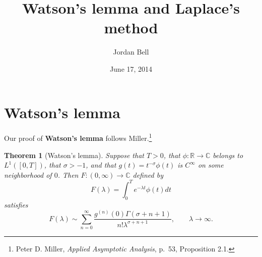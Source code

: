 \documentclass{article}
\newtheorem{theorem}{Theorem}
\theoremstyle{definition}
\begin{document}
\title{Watson's lemma and Laplace's method}
\author{Jordan Bell}
\date{June 17, 2014}

\maketitle


\section{Watson's lemma}
Our proof of \textbf{Watson's lemma} follows Miller.\footnote{Peter D. Miller, {\em Applied Asymptotic Analysis}, p.~53, Proposition 2.1.}

\begin{theorem}[Watson's lemma]
Suppose that $T>0$, that $\phi:\mathbb{R} \to \mathbb{C}$ belongs to 
$L^1([0,T])$, 
that $\sigma>-1$, and that  $g(t)=t^{-\sigma} \phi(t)$ is $C^\infty$ on some neighborhood of $0$.
Then $F:(0,\infty) \to \mathbb{C}$ defined by
\[
F(\lambda) = \int_0^T e^{-\lambda t} \phi(t) dt
\]
satisfies
\[
F(\lambda) \sim \sum_{n =0}^\infty \frac{g^{(n)}(0) \Gamma(\sigma+n+1)}{n! \lambda^{\sigma+n+1}}, \qquad \lambda \to \infty.
\]
\end{theorem}
\end{document}
